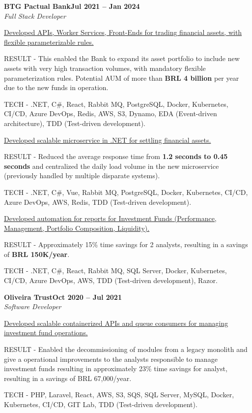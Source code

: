 \documentclass[letterpaper,10pt]{article}
\newcommand{\heading}[2]{
  \hspace{10pt}#1\hfill#2\\
}
\newcommand{\headingBf}[2]{
  \heading{\textbf{#1}}{\textbf{#2}}
}
\newcommand{\headingIt}[2]{
  \heading{\textit{#1}}{\textit{#2}}
}
\newenvironment{resume_list}{
  \vspace{-7pt}
  \begin{itemize}[itemsep=-2px, parsep=1pt, leftmargin=30pt]
}{
  \end{itemize}
}
\newcommand{\itemTitle}[1]{
  \item[] \underline{#1}\vspace{4pt}
}
\begin{document}
  \headingBf{BTG Pactual Bank}{Jul 2021 -- Jan 2024}
  \headingIt{Full Stack Developer}{}
  \begin{resume_list}
    \itemTitle{Developed APIs, Worker Services, Front-Ends for trading financial assets, with flexible parameterizable rules.}
    \item RESULT - This enabled the Bank to expand its asset portfolio to include new assets with very high transaction volumes, with mandatory flexible parameterization rules. Potential AUM of more than \textbf{BRL 4 billion} per year due to the new funds in operation.
    \item TECH - .NET, C\#, React, Rabbit MQ, PostgreSQL, Docker, Kubernetes, CI/CD, Azure DevOps, Redis, AWS, S3, Dynamo, EDA (Event-driven architecture), TDD (Test-driven development).
    \vspace{5pt}
    \itemTitle{Developed scalable microservice in .NET for settling financial assets.}
    \item RESULT - Reduced the average response time from \textbf{1.2 seconds to 0.45 seconds} and centralized the daily load volume in the new microservice (previously handled by multiple disparate systems). 
    \item TECH - .NET, C\#, Vue, Rabbit MQ, PostgreSQL, Docker, Kubernetes, CI/CD, Azure DevOps, AWS, Redis, TDD (Test-driven development).
    \vspace{5pt}
    \itemTitle{Developed automation for reports for Investment Funds (Performance, Management, Portfolio Composition, Liquidity).}
    \item RESULT - Approximately 15\% time savings for 2 analysts, resulting in a savings of \textbf{BRL 150K/year}.
    \item TECH - .NET, C\#, React, Rabbit MQ, SQL Server, Docker, Kubernetes, CI/CD, Azure DevOps, AWS, TDD (Test-driven development), Razor.
  \end{resume_list}


  \headingBf{Oliveira Trust}{Oct 2020 -- Jul 2021}
  \headingIt{Software Developer}{}
  \begin{resume_list}
    \itemTitle{Developed scalable containerized APIs and queue consumers for managing investment fund operations.}
    \item RESULT - Enabled the decommissioning of modules from a legacy monolith and give a operational improvements to the analysts responsible to manage investment funds resulting in approximately  23\% time savings for analyst, resulting in a savings of BRL 67,000/year.
    \item TECH - PHP, Laravel, React, AWS, S3, SQS, SQL Server, MySQL, Docker, Kubernetes, CI/CD, GIT Lab, TDD (Test-driven development).
  \end{resume_list}
\end{document}
